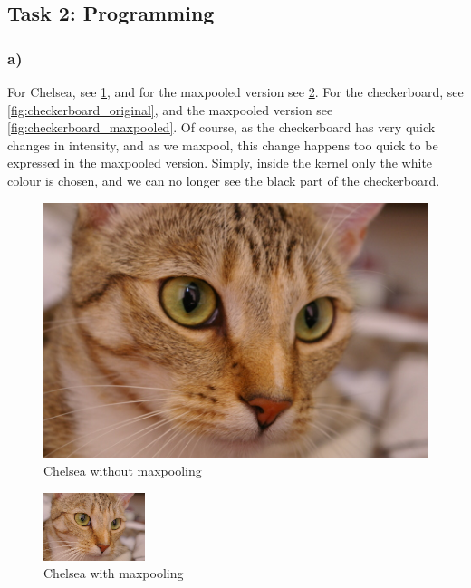 \newpage
\subsection{Task 2: Programming}


\subsubsection*{a)}
For Chelsea, see \cref{fig:chelsea_original}, and for the maxpooled version see \cref{fig:chelsea_maxpooled}. For the checkerboard, see \cref{fig:checkerboard_original}, and the maxpooled version see \cref{fig:checkerboard_maxpooled}. Of course, as the checkerboard has very quick changes in intensity, and as we maxpool, this change happens too quick to be expressed in the maxpooled version. Simply, inside the kernel only the white colour is chosen, and we can no longer see the black part of the checkerboard. 

\begin{figure}[]
    \centering
    \includegraphics{figures/image_processed/chelsea.png}
    \caption{Chelsea without maxpooling}
    \label{fig:chelsea_original}
\end{figure}

\begin{figure}[]
    \centering
    \includegraphics{figures/image_processed/chelsea_maxpooled.png}
    \caption{Chelsea with maxpooling}
    \label{fig:chelsea_maxpooled}
\end{figure}


